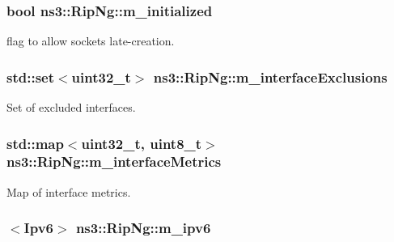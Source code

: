 \subsubsection[{\texorpdfstring{m\+\_\+initialized}{m_initialized}}]{\setlength{\rightskip}{0pt plus 5cm}bool ns3\+::\+Rip\+Ng\+::m\+\_\+initialized\hspace{0.3cm}{\ttfamily [private]}}\hypertarget{classns3_1_1RipNg_a789ca251ab1d869da5f62a4286067d2d}{}\label{classns3_1_1RipNg_a789ca251ab1d869da5f62a4286067d2d}


flag to allow socket\textquotesingle{}s late-\/creation. 

\subsubsection[{\texorpdfstring{m\+\_\+interface\+Exclusions}{m_interfaceExclusions}}]{\setlength{\rightskip}{0pt plus 5cm}std\+::set$<$uint32\+\_\+t$>$ ns3\+::\+Rip\+Ng\+::m\+\_\+interface\+Exclusions\hspace{0.3cm}{\ttfamily [private]}}\hypertarget{classns3_1_1RipNg_a98c5b63bb7c56afa595c1bb568a7081f}{}\label{classns3_1_1RipNg_a98c5b63bb7c56afa595c1bb568a7081f}


Set of excluded interfaces. 

\subsubsection[{\texorpdfstring{m\+\_\+interface\+Metrics}{m_interfaceMetrics}}]{\setlength{\rightskip}{0pt plus 5cm}std\+::map$<$uint32\+\_\+t, uint8\+\_\+t$>$ ns3\+::\+Rip\+Ng\+::m\+\_\+interface\+Metrics\hspace{0.3cm}{\ttfamily [private]}}\hypertarget{classns3_1_1RipNg_aa63ca4f7ad5ad13c878220c51d8b89c5}{}\label{classns3_1_1RipNg_aa63ca4f7ad5ad13c878220c51d8b89c5}


Map of interface metrics. 

\subsubsection[{\texorpdfstring{m\+\_\+ipv6}{m_ipv6}}]{$<${\bf Ipv6}$>$ ns3\+::\+Rip\+Ng\+::m\+\_\+ipv6\hspace{0.3cm}{\ttfamily [private]}}\hypertarget{classns3_1_1RipNg_aca7a023799ce2004499a826ba5d5d3fe}{}\label{classns3_1_1RipNg_aca7a023799ce2004499a826ba5d5d3fe}


